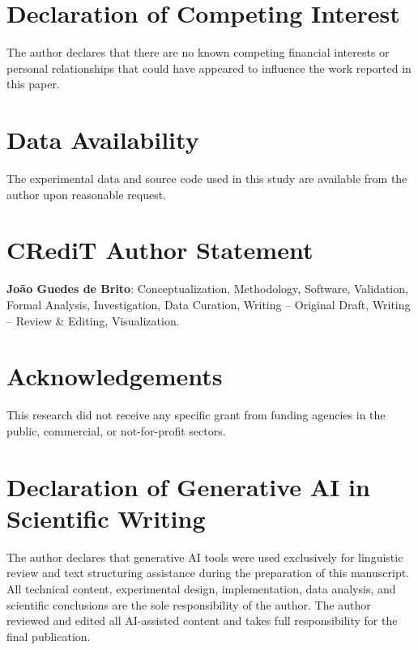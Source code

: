 \documentclass[12pt,a4paper]{article}
\begin{document}

\section*{Declaration of Competing Interest}

The author declares that there are no known competing financial interests or personal relationships that could have appeared to influence the work reported in this paper.

\section*{Data Availability}

The experimental data and source code used in this study are available from the author upon reasonable request.

\section*{CRediT Author Statement}

\textbf{João Guedes de Brito}: Conceptualization, Methodology, Software, Validation, Formal Analysis, Investigation, Data Curation, Writing -- Original Draft, Writing -- Review \& Editing, Visualization.

\section*{Acknowledgements}

This research did not receive any specific grant from funding agencies in the public, commercial, or not-for-profit sectors.

\section*{Declaration of Generative AI in Scientific Writing}

The author declares that generative AI tools were used exclusively for linguistic review and text structuring assistance during the preparation of this manuscript. All technical content, experimental design, implementation, data analysis, and scientific conclusions are the sole responsibility of the author. The author reviewed and edited all AI-assisted content and takes full responsibility for the final publication.
\end{document}
